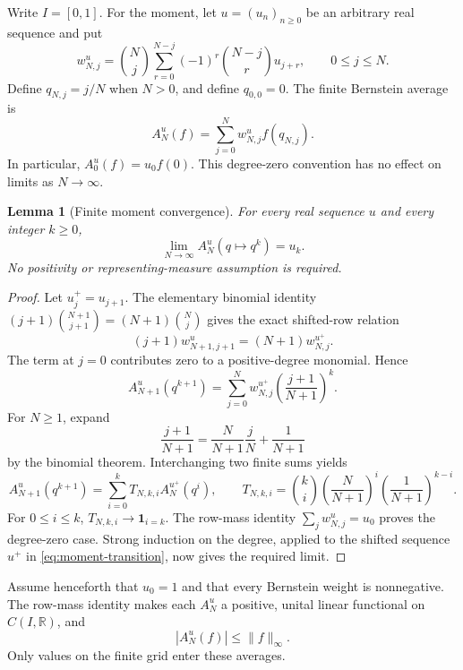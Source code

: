 \documentclass[11pt,a4paper]{article}
\newtheorem{lemma}[theorem]{Lemma}
\theoremstyle{definition}
\numberwithin{equation}{section}
\begin{document}
Write $I=[0,1]$.  For the moment, let $u=(u_n)_{n\geq0}$ be an arbitrary
real sequence and put
\[
 w^u_{N,j}=\binom Nj\sum_{r=0}^{N-j}(-1)^r\binom{N-j}{r}u_{j+r},
 \qquad 0\leq j\leq N.
\]
Define $q_{N,j}=j/N$ when $N>0$, and define $q_{0,0}=0$.
The finite Bernstein average is
\begin{equation}\label{eq:finite-average}
 A_N^u(f)=\sum_{j=0}^{N}w^u_{N,j}f(q_{N,j}).
\end{equation}
In particular, $A_0^u(f)=u_0f(0)$.  This degree-zero convention has no effect on limits as $N\to\infty$.

\begin{lemma}[Finite moment convergence]\label{lem:finite-moment-limit}
For every real sequence $u$ and every integer $k\geq0$,
\[
 \lim_{N\to\infty} A_N^u(q\mapsto q^k)=u_k.
\]
No positivity or representing-measure assumption is required.
\end{lemma}
\begin{proof}
Let $u^+_j=u_{j+1}$.  The elementary binomial identity
$(j+1)\binom{N+1}{j+1}=(N+1)\binom Nj$ gives the exact shifted-row relation
\[
 (j+1)w^u_{N+1,j+1}=(N+1)w^{u^+}_{N,j}.
\]
The term at $j=0$ contributes zero to a positive-degree monomial.  Hence
\[
 A_{N+1}^u(q^{k+1})=
 \sum_{j=0}^Nw^{u^+}_{N,j}\left(\frac{j+1}{N+1}\right)^k.
\]
For $N\geq1$, expand
\[
 \frac{j+1}{N+1}=\frac{N}{N+1}\frac jN+\frac1{N+1}
\]
by the binomial theorem.  Interchanging two finite sums yields
\begin{equation}\label{eq:moment-transition}
 A_{N+1}^u(q^{k+1})=
 \sum_{i=0}^k T_{N,k,i} A_N^{u^+}(q^i),\qquad
 T_{N,k,i}=\binom ki\left(\frac{N}{N+1}\right)^i
                   \left(\frac1{N+1}\right)^{k-i}.
\end{equation}
For $0\leq i\leq k$, $T_{N,k,i}\to\mathbf{1}_{i=k}$.
The row-mass identity $\sum_jw^u_{N,j}=u_0$ proves the degree-zero case.
Strong induction on the degree, applied to the shifted sequence $u^+$
in \eqref{eq:moment-transition}, now gives the required limit.
\end{proof}

Assume henceforth that $u_0=1$ and that every Bernstein weight is
nonnegative.  The row-mass identity makes each $A_N^u$ a positive,
unital linear functional on $C(I,\mathbb R)$, and
\begin{equation}\label{eq:average-bound}
 |A_N^u(f)|\leq\|f\|_\infty.
\end{equation}
Only values on the finite grid enter these averages.
\end{document}
